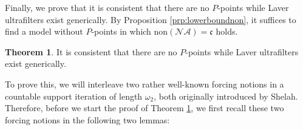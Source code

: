 \documentclass[12pt]{article}
\theoremstyle{definition}
\newtheorem{thm}[nummer]{\sc Theorem}
\begin{document}
Finally, we prove that it is consistent that there are no $P$-points while Laver ultrafilters exist generically. By Proposition \ref{prp:lowerboundnon}, it suffices to find a model without $P$-points in which $\text{non}(\mathcal{NA})=\mathfrak{c}$ holds.

\begin{thm}\label{thm:lavernop-point}
It is consistent that there are no $P$-points while Laver ultrafilters exist generically.
\end{thm}

To prove this, we will interleave two rather well-known forcing notions in a countable support iteration of length $\omega_2$, both originally introduced by Shelah. Therefore, before we start the proof of Theorem \ref{thm:lavernop-point}, we first recall these two forcing notions in the following two lemmas:
\end{document}
